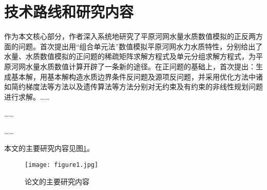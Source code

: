 \section{技术路线和研究内容}
作为本文核心部分，作者深入系统地研究了平原河网水量水质数值模拟的正反两方面的问题。首次提出用“组合单元法”数值模拟平原河网水力水质特性，分别给出了水量、水质数值模拟的正问题的稀疏矩阵求解方程式及单元分组求解方程式，为平原河网水量水质数值计算开辟了一条新的途径。在正问题的基础上，首次提出：生成基本解，用基本解构造水质边界条件反问题及源项反问题，并采用优化方法中诸如简约梯度法等方法以及遗传算法等方法分别对无约束及有约束的非线性规划问题进行求解。……\par
……\par
……\par
本文的主要研究内容见图\ref{fig:maincontents}。

\begin{figure}[H]
	\centering
	\texttt{[image: figure1.jpg]}
	\caption{论文的主要研究内容} \label{fig:maincontents}
\end{figure}

